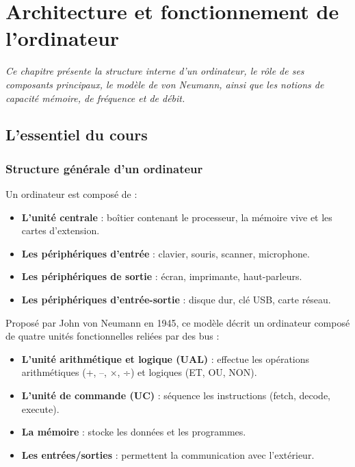 \chapter{Architecture et fonctionnement de l'ordinateur}
\textit{Ce chapitre présente la structure interne d’un ordinateur, le rôle de ses composants principaux, le modèle de von Neumann, ainsi que les notions de capacité mémoire, de fréquence et de débit.}

\section{L'essentiel du cours}

\subsection{Structure générale d’un ordinateur}
Un ordinateur est composé de :
\begin{itemize}
    \item \textbf{L’unité centrale} : boîtier contenant le processeur, la mémoire vive et les cartes d’extension.
    \item \textbf{Les périphériques d’entrée} : clavier, souris, scanner, microphone.
    \item \textbf{Les périphériques de sortie} : écran, imprimante, haut-parleurs.
    \item \textbf{Les périphériques d’entrée-sortie} : disque dur, clé USB, carte réseau.
\end{itemize}

\begin{definition}
Proposé par John von Neumann en 1945, ce modèle décrit un ordinateur composé de quatre unités fonctionnelles reliées par des bus :
\begin{itemize}
    \item \textbf{L’unité arithmétique et logique (UAL)} : effectue les opérations arithmétiques (+, –, ×, ÷) et logiques (ET, OU, NON).
    \item \textbf{L’unité de commande (UC)} : séquence les instructions (fetch, decode, execute).
    \item \textbf{La mémoire} : stocke les données et les programmes.
    \item \textbf{Les entrées/sorties} : permettent la communication avec l’extérieur.
\end{itemize}
\end{definition}

